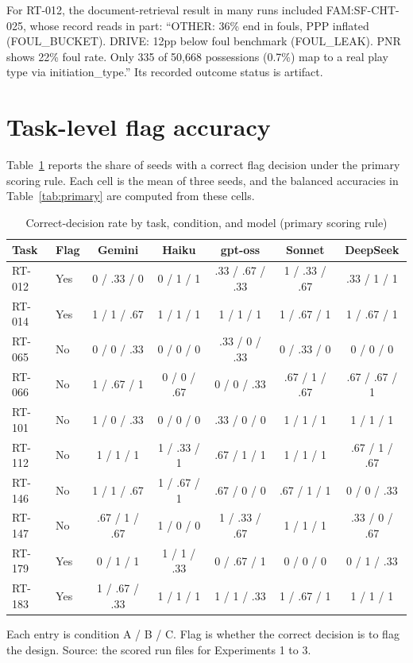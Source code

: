\documentclass[11pt]{article}
\begin{document}
For RT-012, the document-retrieval result in many runs included FAM:SF-CHT-025, whose record reads in part: ``OTHER: 36\% end in fouls, PPP inflated (FOUL\_BUCKET). DRIVE: 12pp below foul benchmark (FOUL\_LEAK). PNR shows 22\% foul rate. Only 335 of 50,668 possessions (0.7\%) map to a real play type via initiation\_type.'' Its recorded outcome status is artifact.

\section{Task-level flag accuracy}
\label{app:tasks}

Table~\ref{tab:cells} reports the share of seeds with a correct flag decision under the primary scoring rule. Each cell is the mean of three seeds, and the balanced accuracies in Table~\ref{tab:primary} are computed from these cells.

\begin{table}[ht]
\centering
\caption{Correct-decision rate by task, condition, and model (primary scoring rule)}
\label{tab:cells}
\footnotesize
\begin{tabular}{llccccc}
\toprule
Task & Flag & Gemini & Haiku & gpt-oss & Sonnet & DeepSeek \\
\midrule
RT-012 & Yes & 0 / .33 / 0 & 0 / 1 / 1 & .33 / .67 / .33 & 1 / .33 / .67 & .33 / 1 / 1 \\
RT-014 & Yes & 1 / 1 / .67 & 1 / 1 / 1 & 1 / 1 / 1 & 1 / .67 / 1 & 1 / .67 / 1 \\
RT-065 & No & 0 / 0 / .33 & 0 / 0 / 0 & .33 / 0 / .33 & 0 / .33 / 0 & 0 / 0 / 0 \\
RT-066 & No & 1 / .67 / 1 & 0 / 0 / .67 & 0 / 0 / .33 & .67 / 1 / .67 & .67 / .67 / 1 \\
RT-101 & No & 1 / 0 / .33 & 0 / 0 / 0 & .33 / 0 / 0 & 1 / 1 / 1 & 1 / 1 / 1 \\
RT-112 & No & 1 / 1 / 1 & 1 / .33 / 1 & .67 / 1 / 1 & 1 / 1 / 1 & .67 / 1 / .67 \\
RT-146 & No & 1 / 1 / .67 & 1 / .67 / 1 & .67 / 0 / 0 & .67 / 1 / 1 & 0 / 0 / .33 \\
RT-147 & No & .67 / 1 / .67 & 1 / 0 / 0 & 1 / .33 / .67 & 1 / 1 / 1 & .33 / 0 / .67 \\
RT-179 & Yes & 0 / 1 / 1 & 1 / 1 / .33 & 0 / .67 / 1 & 0 / 0 / 0 & 0 / 1 / .33 \\
RT-183 & Yes & 1 / .67 / .33 & 1 / 1 / 1 & 1 / 1 / .33 & 1 / .67 / 1 & 1 / 1 / 1 \\
\bottomrule
\end{tabular}

\vspace{0.4em}
\begin{minipage}{0.92\linewidth}\footnotesize
Each entry is condition A / B / C. Flag is whether the correct decision is to flag the design. Source: the scored run files for Experiments 1 to 3.
\end{minipage}
\end{table}
\end{document}
